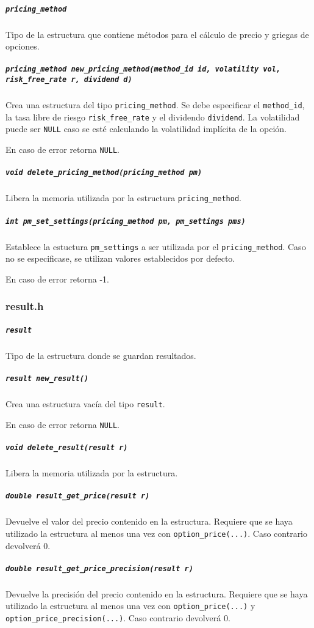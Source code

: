 \documentclass[12pt,a4paper,final]{article}
\begin{document}
			\subparagraph{\texttt{pricing\_method}}
				Tipo de la estructura que contiene métodos para el cálculo de precio y griegas
				de opciones.	
				
			\subparagraph{\texttt{pricing\_method new\_pricing\_method(method\_id id, volatility vol, risk\_free\_rate r, dividend d)}}
				Crea una estructura del tipo \texttt{pricing\_method}. Se debe especificar el \texttt{method\_id},
				la tasa libre de riesgo \texttt{risk\_free\_rate} y el dividendo \texttt{dividend}. La volatilidad
				puede ser \texttt{NULL} caso se esté calculando la volatilidad implícita de la opción.
				
				En caso de error retorna \texttt{NULL}.
				
			\subparagraph{\texttt{void delete\_pricing\_method(pricing\_method pm)}}
				Libera la memoria utilizada por la estructura \texttt{pricing\_method}.
				
			\subparagraph{\texttt{int pm\_set\_settings(pricing\_method pm, pm\_settings pms)}}
				Establece la estuctura \texttt{pm\_settings} a ser utilizada por el \texttt{pricing\_method}.
				Caso no se especificase, se utilizan valores establecidos por defecto.
				
				En caso de error retorna -1.
												
		\subsubsection{result.h}
			\subparagraph{\texttt{result}}
				Tipo de la estructura donde se guardan resultados.
			
			\subparagraph{\texttt{result new\_result()}}
				Crea una estructura vacía del tipo \texttt{result}.
				
				En caso de error retorna \texttt{NULL}.
				
			\subparagraph{\texttt{void delete\_result(result r)}}
				Libera la memoria utilizada por la estructura.
				
			\subparagraph{\texttt{double result\_get\_price(result r)}}
				Devuelve el valor del precio contenido en la estructura.
				Requiere que se haya utilizado la estructura al menos una vez 
				con \texttt{option\_price(...)}. Caso contrario devolverá 0.
				
			\subparagraph{\texttt{double result\_get\_price\_precision(result r)}}
				Devuelve la precisión del precio contenido en la estructura.
				Requiere que se haya utilizado la estructura al menos una vez 
				con \texttt{option\_price(...)} y \texttt{option\_price\_precision(...)}. 
				Caso contrario devolverá 0.	
				
\end{document}
